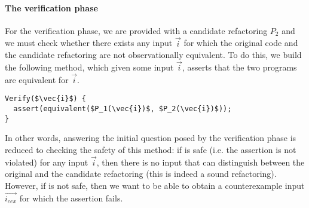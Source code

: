 \documentclass[sigconf,review,anonymous]{acmart}
\begin{document}


\paragraph{The verification phase} For the verification phase, we are provided with a candidate
refactoring $P_2$ and we must check whether there exists any input
$\vec{i}$ for which the original code and the candidate
refactoring are not observationally equivalent.  To do this, we build
the following  method, which given some input
$\vec{i}$, asserts that the two programs are equivalent for
$\vec{i}$.

\begin{lstlisting}[mathescape=true,showstringspaces=false]
Verify($\vec{i}$) {
  assert(equivalent($P_1(\vec{i})$, $P_2(\vec{i})$));
}
\end{lstlisting}

In other words, answering the initial question posed by the verification
phase is reduced to checking the safety of this method: if
 is safe (i.e. the assertion is not violated) for any
input $\vec{i}$, then there is no input that can distinguish
between the original and the candidate refactoring (this
is indeed a sound refactoring). However, if  is not safe,
then we want to be able to obtain a counterexample input
$\vec{i_{cex}}$ for which the assertion fails.
\end{document}
